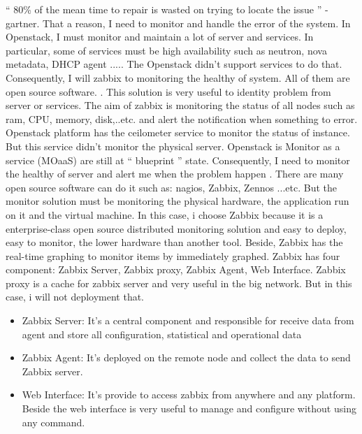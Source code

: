 	 \enquote{ 80\% of the mean time to repair is wasted on trying to locate the issue } - gartner. 
 That a reason, I need to monitor and handle the error of the system. In Openstack, I must monitor and maintain a lot of server and services. In particular, some of services must be high availability such as neutron, nova metadata, DHCP agent ..... The Openstack didn't support services to do that. Consequently, I will zabbix to monitoring the healthy of system. All of them are open source software. . This solution is very useful to identity problem from server or services. The aim of zabbix is monitoring the status of all nodes such as ram, CPU, memory, disk,..etc. and alert the notification when something to error.
Openstack platform has the ceilometer service to monitor the status of instance. But this service didn't monitor the physical server. 
Openstack is Monitor as a service (MOaaS) are still at  \enquote{ blueprint } state.
 Consequently, I need to monitor the healthy of server and alert me when the problem happen . 
There are many open source software can do it such as: nagios, Zabbix, Zennos ...etc. But the monitor solution must be monitoring the physical hardware, the application run on it and the virtual machine. In this case, i choose Zabbix because it is a enterprise-class open source distributed monitoring solution and  easy to deploy, easy to monitor, the lower hardware than another tool. Beside, Zabbix has the real-time graphing to monitor items by immediately graphed.
 Zabbix has four component: Zabbix Server, Zabbix proxy, Zabbix Agent, Web Interface. Zabbix proxy is a cache for zabbix server and very useful in the big network.
 But in this case, i will not deployment that. 
\begin{itemize}
  \item Zabbix Server: It's a central component and responsible for receive data from agent and store all configuration, statistical and operational data

  \item Zabbix Agent: It's deployed on the remote node and collect the data to send Zabbix server.
	\item Web Interface: It's provide to access zabbix from anywhere and any platform. Beside the web interface is very useful to manage and configure without using any command.
\end{itemize}